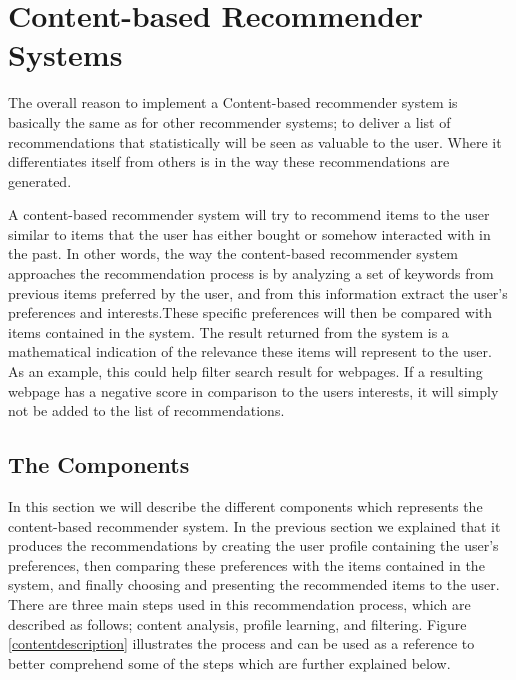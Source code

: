 \section{Content-based Recommender Systems}
\label{sec:content}
The overall reason to implement a Content-based recommender system is basically the same as for other recommender systems; to deliver a list of recommendations that statistically will be seen as valuable to the user. Where it differentiates itself from others is in the way these recommendations are generated.\newline 

A content-based recommender system will try to recommend items to the user similar to items that the user has either bought or somehow interacted with in the past. In other words, the way the content-based recommender system approaches the recommendation process is by analyzing a set of keywords from previous items preferred by the user, and from this information extract the user's preferences and interests.These specific preferences will then be compared with items contained in the system.\newline
The result returned from the system is a mathematical indication of the relevance these items will represent to the user. As an example, this could help filter search result for webpages. If a resulting webpage has a negative score in comparison to the users interests, it will simply not be added to the list of recommendations.

\subsection{The Components}
In this section we will describe the different components which represents the content-based recommender system. In the previous section we explained that it produces the recommendations by creating the user profile containing the user's preferences, then comparing these preferences with the items contained in the system, and finally choosing and presenting the recommended items to the user. \newline
There are three main steps used in this recommendation process, which are described as follows; content analysis, profile learning, and filtering. Figure \ref{contentdescription} illustrates the process and can be used as a reference to better comprehend some of the steps which are further explained below.

